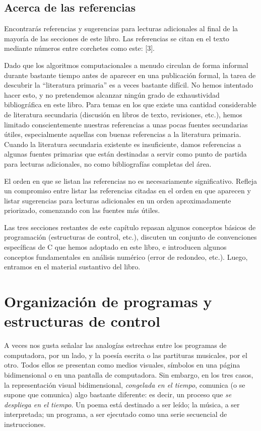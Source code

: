 \documentclass[10pt,a4paper]{book}
\begin{document}
\subsection{Acerca de las referencias}

Encontrarás referencias y sugerencias para lecturas adicionales al final de la mayoría de las secciones de este libro. Las referencias se citan en el texto mediante números entre corchetes como este: [3].

\medskip

Dado que los algoritmos computacionales a menudo circulan de forma informal durante bastante tiempo antes de aparecer en una publicación formal, la tarea de descubrir la “literatura primaria” es a veces bastante difícil. No hemos intentado hacer esto, y no pretendemos alcanzar ningún grado de exhaustividad bibliográfica en este libro. Para temas en los que existe una cantidad considerable de literatura secundaria (discusión en libros de texto, revisiones, etc.), hemos limitado conscientemente nuestras referencias a unas pocas fuentes secundarias útiles, especialmente aquellas con buenas referencias a la literatura primaria. Cuando la literatura secundaria existente es insuficiente, damos referencias a algunas fuentes primarias que están destinadas a servir como punto de partida para lecturas adicionales, no como bibliografías completas del área.

\medskip

El orden en que se listan las referencias no es necesariamente significativo. Refleja un compromiso entre listar las referencias citadas en el orden en que aparecen y listar sugerencias para lecturas adicionales en un orden aproximadamente priorizado, comenzando con las fuentes más útiles.

\medskip

Las tres secciones restantes de este capítulo repasan algunos conceptos básicos de programación (estructuras de control, etc.), discuten un conjunto de convenciones específicas de C que hemos adoptado en este libro, e introducen algunos conceptos fundamentales en análisis numérico (error de redondeo, etc.). Luego, entramos en el material sustantivo del libro.

\newpage

\section{Organización de programas y estructuras de control}

A veces nos gusta señalar las analogías estrechas entre los programas de computadora, por un lado, y la poesía escrita o las partituras musicales, por el otro. Todos ellos se presentan como medios visuales, símbolos en una página bidimensional o en una pantalla de computadora. Sin embargo, en los tres casos, la representación visual bidimensional, \textit{congelada en el tiempo}, comunica (o se supone que comunica) algo bastante diferente: es decir, un proceso que \textit{se despliega en el tiempo}. Un poema está destinado a ser leído; la música, a ser interpretada; un programa, a ser ejecutado como una serie secuencial de instrucciones.
\end{document}
